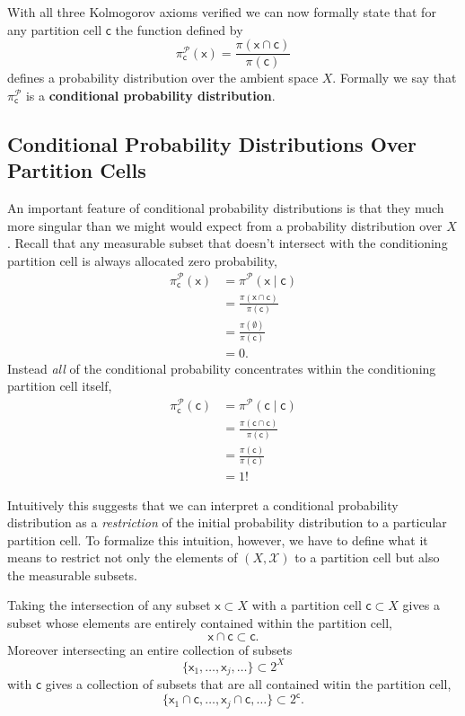 \documentclass[
  letterpaper,
  DIV=11,
  numbers=noendperiod]{scrartcl}
\begin{document}
With all three Kolmogorov axioms verified we can now formally state that
for any partition cell \(\mathsf{c}\) the function defined by \[
\pi^{\mathcal{P}}_{\mathsf{c}}( \mathsf{x} )
=
\frac{ \pi( \mathsf{x} \cap \mathsf{c}) }{ \pi (\mathsf{c}) }
\] defines a probability distribution over the ambient space \(X\).
Formally we say that \(\pi^{\mathcal{P}}_{\mathsf{c}}\) is a
\textbf{conditional probability distribution}.

\subsection{Conditional Probability Distributions Over Partition
Cells}\label{conditional-probability-distributions-over-partition-cells}

An important feature of conditional probability distributions is that
they much more singular than we might would expect from a probability
distribution over \(X\). Recall that any measurable subset that doesn't
intersect with the conditioning partition cell is always allocated zero
probability, \begin{align*}
\pi^{\mathcal{P}}_{\mathsf{c}}( \mathsf{x} )
&=
\pi^{\mathcal{P}}( \mathsf{x} \mid \mathsf{c} )
\\
&=
\frac{ \pi(\mathsf{x} \cap \mathsf{c}) }{ \pi(\mathsf{c}) }
\\
&=
\frac{ \pi(\emptyset) }{ \pi(\mathsf{c}) }
\\
&=
0.
\end{align*} Instead \emph{all} of the conditional probability
concentrates within the conditioning partition cell itself,
\begin{align*}
\pi^{\mathcal{P}}_{\mathsf{c}}( \mathsf{c} )
&=
\pi^{\mathcal{P}}( \mathsf{c} \mid \mathsf{c} )
\\
&=
\frac{ \pi(\mathsf{c} \cap \mathsf{c}) }{ \pi(\mathsf{c}) }
\\
&=
\frac{ \pi(\mathsf{c}) }{ \pi(\mathsf{c}) }
\\
&=
1!
\end{align*}

Intuitively this suggests that we can interpret a conditional
probability distribution as a \emph{restriction} of the initial
probability distribution to a particular partition cell. To formalize
this intuition, however, we have to define what it means to restrict not
only the elements of \((X, \mathcal{X})\) to a partition cell but also
the measurable subsets.

Taking the intersection of any subset \(\mathsf{x} \subset X\) with a
partition cell \(\mathsf{c} \subset X\) gives a subset whose elements
are entirely contained within the partition cell, \[
\mathsf{x} \cap \mathsf{c} \subset \mathsf{c}.
\] Moreover intersecting an entire collection of subsets \[
\{ \mathsf{x}_{1}, \ldots, \mathsf{x}_{j}, \ldots \} \subset 2^{X}
\] with \(\mathsf{c}\) gives a collection of subsets that are all
contained witin the partition cell, \[
\{ \mathsf{x}_{1} \cap \mathsf{c}, \ldots,
   \mathsf{x}_{j} \cap \mathsf{c}, \ldots \} \subset 2^{\mathsf{c}}.
\]
\end{document}
